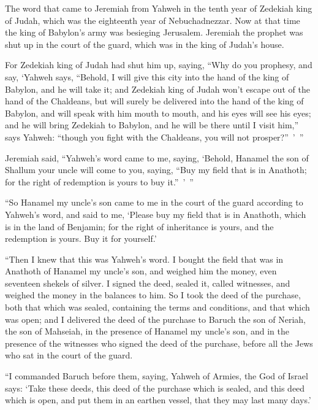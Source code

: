 {The word that came to Jeremiah from Yahweh in the tenth year of Zedekiah king of Judah, which was the eighteenth year of Nebuchadnezzar.
Now at that time the king of Babylon’s army was besieging Jerusalem. Jeremiah the prophet was shut up in the court of the guard, which was in the king of Judah’s house.
\par }{\PP {}For Zedekiah king of Judah had shut him up, saying, “Why do you prophesy, and say, ‘Yahweh says, “Behold, I will give this city into the hand of the king of Babylon, and he will take it;
and Zedekiah king of Judah won’t escape out of the hand of the Chaldeans, but will surely be delivered into the hand of the king of Babylon, and will speak with him mouth to mouth, and his eyes will see his eyes;
and he will bring Zedekiah to Babylon, and he will be there until I visit him,” says Yahweh: “though you fight with the Chaldeans, you will not prosper?” ’ ”
\par }{\PP {}Jeremiah said, “Yahweh’s word came to me, saying,
‘Behold, Hanamel the son of Shallum your uncle will come to you, saying, “Buy my field that is in Anathoth; for the right of redemption is yours to buy it.” ’ ”
\par }{\PP {}“So Hanamel my uncle’s son came to me in the court of the guard according to Yahweh’s word, and said to me, ‘Please buy my field that is in Anathoth, which is in the land of Benjamin; for the right of inheritance is yours, and the redemption is yours. Buy it for yourself.’
\par }{\PP “Then I knew that this was Yahweh’s word.
I bought the field that was in Anathoth of Hanamel my uncle’s son, and weighed him the money, even seventeen shekels of silver.
I signed the deed, sealed it, called witnesses, and weighed the money in the balances to him.
So I took the deed of the purchase, both that which was sealed, containing the terms and conditions, and that which was open;
and I delivered the deed of the purchase to Baruch the son of Neriah, the son of Mahseiah, in the presence of Hanamel my uncle’s son, and in the presence of the witnesses who signed the deed of the purchase, before all the Jews who sat in the court of the guard.
\par }{\PP {}“I commanded Baruch before them, saying,
Yahweh of Armies, the God of Israel says: ‘Take these deeds, this deed of the purchase which is sealed, and this deed which is open, and put them in an earthen vessel, that they may last many days.’
}
